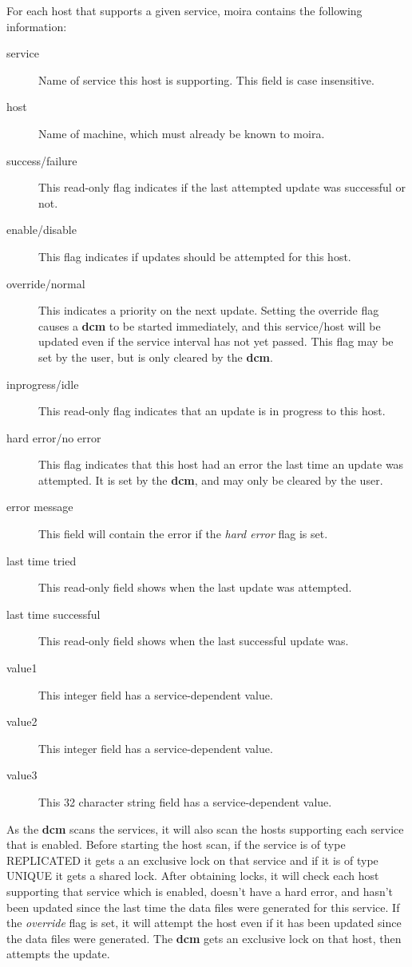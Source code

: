 \documentclass{book}
\begin{document}
For each host that supports a given service, moira contains the
following information:
\begin{description}
\item[service] Name of service this host is supporting.  This field is case
insensitive.
\item[host] Name of machine, which must already be known to moira.
\item[success/failure] This read-only flag indicates if the last attempted update was
successful or not.
\item[enable/disable] This flag indicates if updates should be attempted for
this host.
\item[override/normal] This indicates a priority on the next update.
Setting the override flag causes a {\bf dcm} to be started immediately,
and this service/host will be updated even if the service interval has
not yet passed.  This flag may be set by the user, but is only cleared
by the {\bf dcm}.
\item[inprogress/idle] This read-only flag indicates that an update is in
progress to this host.
\item[hard error/no error] This flag indicates that this host had an error
the last time an update was attempted.  It is set by the {\bf dcm}, and
may only be cleared by the user.
\item[error message] This field will contain the error if the {\em hard error}
flag is set.
\item[last time tried] This read-only field shows when the last update was
attempted.
\item[last time successful] This read-only field shows when the last
successful update was.
\item[value1] This integer field has a service-dependent value.
\item[value2] This integer field has a service-dependent value.
\item[value3] This 32 character string field has a service-dependent value.
\end{description}

As the {\bf dcm} scans the services, it will also scan the hosts
supporting each service that is enabled.  Before starting the host
scan, if the service is of type REPLICATED it gets a an exclusive lock
on that service and if it is of type UNIQUE it gets a shared lock.
After obtaining locks, it will check each host supporting that service
which is enabled, doesn't have a hard error, and hasn't been updated
since the last time the data files were generated for this service.
If the {\em override} flag is set, it will attempt the host even if it
has been updated since the data files were generated.  The {\bf dcm}
gets an exclusive lock on that host, then attempts the update.
\end{document}
